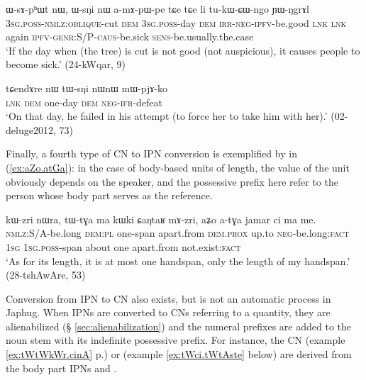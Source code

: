 \begin{exe}
\ex \label{ex:WsAphWt.WsNi}
\gll ɯ-sɤ-pʰɯt nɯ, ɯ-sŋi nɯ a-mɤ-pɯ-pe tɕe tɕe li tu-kɯ-ɕɯ-ngo ɲɯ-ŋgrɤl \\
\textsc{3sg}.\textsc{poss}-\textsc{nmlz}:\textsc{oblique}-cut \textsc{dem} \textsc{3sg}.\textsc{poss}-day \textsc{dem} \textsc{irr}-\textsc{neg}-\textsc{ipfv}-be.good \textsc{lnk} \textsc{lnk} again \textsc{ipfv}-\textsc{genr}:S/P-\textsc{caus}-be.sick \textsc{sens}-be.usually.the.case \\
\glt `If the day when (the tree) is cut is not good (not auspicious), it causes people to become sick.' (24-kWqar, 9)
\end{exe}

\begin{exe}
\ex \label{ex:nW.tWsNi}
\gll tɕendɤre nɯ tɯ-sŋi nɯnɯ mɯ-pjɤ-ko \\
\textsc{lnk} \textsc{dem} one-day \textsc{dem} \textsc{neg}-\textsc{ifr}-defeat \\
\glt `On that day, he failed in his attempt (to force her to take him with her).' (02-deluge2012, 73)
\end{exe}
Finally, a fourth type of CN to IPN conversion is exemplified by  in (\ref{ex:aZo.atGa}): in the case of body-based units of length, the value of the unit obviously depends on the speaker, and the possessive prefix here refer to the person whose body part serves as the reference.

\begin{exe}
\ex \label{ex:aZo.atGa}
\gll kɯ-zri nɯra, tɯ-tɣa ma kɯki ɕaŋtaʁ mɤ-zri, aʑo a-tɣa jamar ci ma me. \\
 \textsc{nmlz}:S/A-be.long \textsc{dem}:\textsc{pl} one-span apart.from \textsc{dem}.\textsc{prox} up.to \textsc{neg}-be.long:\textsc{fact} \textsc{1sg} \textsc{1sg}.\textsc{poss}-span about one apart.from not.exist:\textsc{fact} \\
\glt `As for its length, it is at most one handspan, only the length of my handspan.' (28-tshAwAre, 53)
\end{exe}

Conversion from IPN to CN also exists, but is not an automatic process in Japhug. When IPNs are converted to CNs referring to a quantity, they are alienabilized (§ \ref{sec:alienabilization}) and the numeral prefixes are added to the noun stem with its indefinite possessive prefix. For instance, the CN  (example \ref{ex:tWtWkWr.cinA} p.\pageref{ex:tWtWkWr.cinA}) or  (example \ref{ex:tWci.tWtAste} below) are derived from the body part IPNs  and . 

